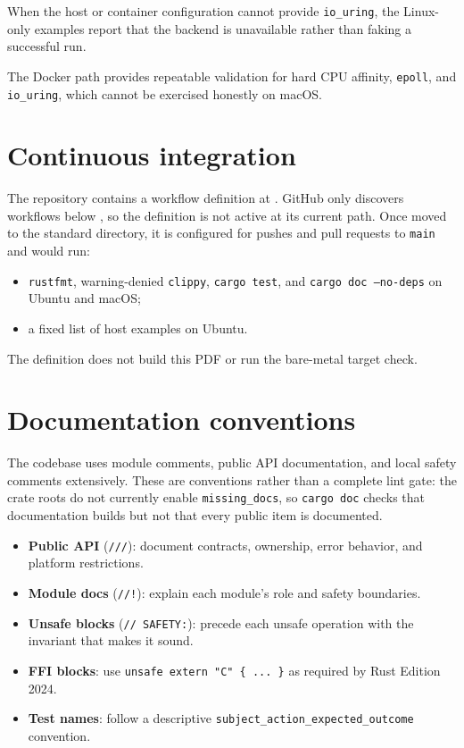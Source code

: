 When the host or container configuration cannot provide \texttt{io\_uring}, the
Linux-only examples report that the backend is unavailable rather than faking a
successful run.

The Docker path provides repeatable validation for hard CPU affinity,
\texttt{epoll}, and \texttt{io\_uring}, which cannot be exercised honestly on
macOS.

\section{Continuous integration}

The repository contains a workflow definition at
. GitHub only discovers workflows below
, so the definition is not active at its current
path. Once moved to the standard directory, it is configured for pushes and
pull requests to \texttt{main} and would run:

\begin{itemize}
    \item \texttt{rustfmt}, warning-denied \texttt{clippy},
          \texttt{cargo test}, and \texttt{cargo doc --no-deps} on Ubuntu and
          macOS;
    \item a fixed list of host examples on Ubuntu.
\end{itemize}

The definition does not build this PDF or run the bare-metal target check.


\section{Documentation conventions}

The codebase uses module comments, public API documentation, and local safety
comments extensively. These are conventions rather than a complete lint gate:
the crate roots do not currently enable \texttt{missing\_docs}, so
\texttt{cargo doc} checks that documentation builds but not that every public
item is documented.

\begin{itemize}
    \item \textbf{Public API} (\texttt{///}): document contracts, ownership,
          error behavior, and platform restrictions.
    \item \textbf{Module docs} (\texttt{//!}): explain each module's role and
          safety boundaries.
    \item \textbf{Unsafe blocks} (\texttt{// SAFETY:}): precede each unsafe
          operation with the invariant that makes it sound.
    \item \textbf{FFI blocks}: use \texttt{unsafe extern "C" \{ ... \}} as
          required by Rust Edition 2024.
    \item \textbf{Test names}: follow a descriptive
          \texttt{subject\_action\_expected\_outcome} convention.
\end{itemize}

